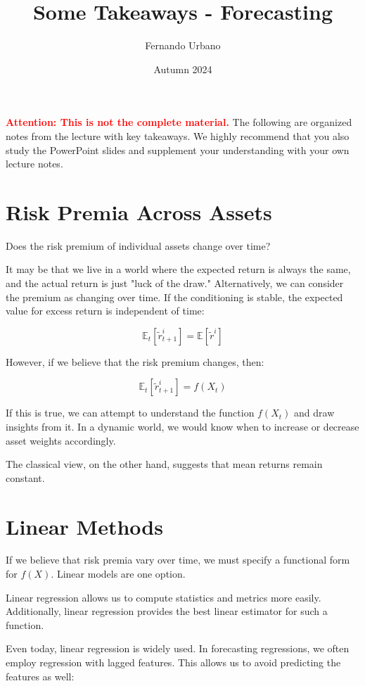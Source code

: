 \documentclass{article}
\title{Some Takeaways - Forecasting}
\author{Fernando Urbano}
\date{Autumn 2024}
\newcommand{\redbold}[1]{\textbf{\textcolor{red}{#1}}}
\begin{document}
\maketitle

\redbold{Attention: This is not the complete material.} The following are organized notes from the lecture with key takeaways. We highly recommend that you also study the PowerPoint slides and supplement your understanding with your own lecture notes.

\section{Risk Premia Across Assets}

Does the risk premium of individual assets change over time?

It may be that we live in a world where the expected return is always the same, and the actual return is just "luck of the draw." Alternatively, we can consider the premium as changing over time. If the conditioning is stable, the expected value for excess return is independent of time:

$$
\mathbb{E}_t[\tilde{r}^i_{t+1}] = \mathbb{E}[\tilde{r}^i]
$$

However, if we believe that the risk premium changes, then:

$$
\mathbb{E}_t[\tilde{r}^i_{t+1}] = f(X_t)
$$

If this is true, we can attempt to understand the function $f(X_t)$ and draw insights from it. In a dynamic world, we would know when to increase or decrease asset weights accordingly.

The classical view, on the other hand, suggests that mean returns remain constant.

\section{Linear Methods}

If we believe that risk premia vary over time, we must specify a functional form for $f(X)$. Linear models are one option.

Linear regression allows us to compute statistics and metrics more easily. Additionally, linear regression provides the best linear estimator for such a function.

Even today, linear regression is widely used. In forecasting regressions, we often employ regression with lagged features. This allows us to avoid predicting the features as well:
\end{document}
